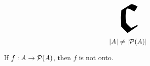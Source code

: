 
\begin{frame}{}
  \begin{center}
  \end{center}

  \[
    \scalebox{8.5}{$\mathfrak{c}$}
  \]
\end{frame}

\begin{frame}{}
  \begin{theorem}
    \[
      |A| \neq |\mathcal{P}(A)|
    \]
  \end{theorem}

  \pause
  \vspace{0.80cm}
  \begin{theorem}
    If $f: A \to \mathcal{P}(A)$, then $f$ is not onto.
  \end{theorem}
\end{frame}





